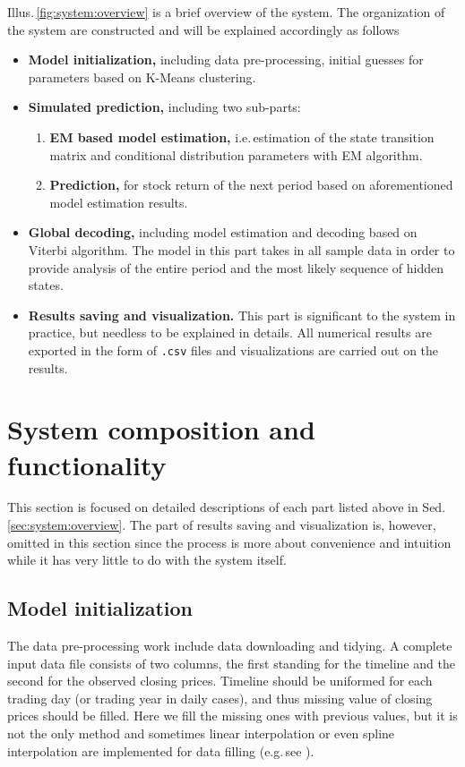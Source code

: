 Illus.\,\ref{fig:system:overview} is a brief overview of the system.
The organization of the system are constructed and will be explained accordingly as follows
	\begin{itemize}
	\item \textbf{Model initialization,} including data pre-processing,
		  initial guesses for parameters based on K-Means clustering.
	\item \textbf{Simulated prediction,} including two sub-parts:
		  \begin{enumerate}
		  \item \textbf{EM based model estimation,} i.e.\,estimation of the state transition matrix
		  		and conditional distribution parameters with EM algorithm.
		  \item \textbf{Prediction,} for stock return of the next period based on 
		  		aforementioned model estimation results.
		  \end{enumerate}
	\item \textbf{Global decoding,} including model estimation and 
		  decoding based on Viterbi algorithm. 
		  The model in this part takes in all sample data in order to 
		  provide analysis of the entire period and the most likely sequence of hidden states.
	\item \textbf{Results saving and visualization.} This part is significant to the system in practice,
		  but needless to be explained in details. 
		  All numerical results are exported in the form of \texttt{.csv} files and 
		  visualizations are carried out on the results.
	\end{itemize}


\section{System composition and functionality}
\label{sec:system:function}
This section is focused on detailed descriptions of 
each part listed above in Sed. \ref{sec:system:overview}.
The part of results saving and visualization is, however, omitted in this section
since the process is more about convenience and intuition 
while it has very little to do with the system itself.


\subsection{Model initialization}
\label{sec:system:function:init}
The data pre-processing work include data downloading and tidying.
A complete input data file consists of two columns, 
the first standing for the timeline and the second for the observed closing prices.
Timeline should be uniformed for each trading day (or trading year in daily cases),
and thus missing value of closing prices should be filled.
Here we fill the missing ones with previous values,
but it is not the only method and sometimes 
linear interpolation or even spline interpolation are implemented for data filling
(e.g.\,see \cite{Beckers:2003do,Reuter:2007cv}).

